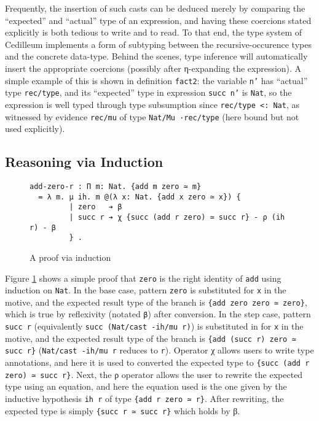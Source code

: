 \documentclass{article}
\begin{document}
Frequently, the insertion of such casts can be deduced merely by comparing the
``expected'' and ``actual'' type of an expression, and having these coercions
stated explicitly is both tedious to write and to read. To that end, the type
system of Cedilleum implements a form of subtyping between the
recursive-occurence types and the concrete data-type. Behind the scenes, type
inference will automatically insert the appropriate coercions (possibly after
η-expanding the expression). A simple example of this is shown in definition
\texttt{fact2}: the variable \texttt{n'} has ``actual'' type \texttt{rec/type}, and its
``expected'' type in expression \texttt{succ n'} is \texttt{Nat}, so the
expression is well typed through type subsumption since \texttt{rec/type <:
  Nat}, as witnessed by evidence \texttt{rec/mu} of type \texttt{Nat/Mu
  ·rec/type} (here bound but not used explicitly).

\subsection{Reasoning via Induction}
\label{sec:induction}
\begin{figure}[h]
\begin{verbatim}
add-zero-r : Π m: Nat. {add m zero ≃ m}
  = λ m. μ ih. m @(λ x: Nat. {add x zero ≃ x}) {
         | zero   ➔ β
         | succ r ➔ χ {succ (add r zero) ≃ succ r} - ρ (ih r) - β
         } .
\end{verbatim}
  \caption{A proof via induction}
  \label{fig:ex-data-ind}
\end{figure}
Figure \ref{fig:ex-data-ind} shows a simple proof that \texttt{zero} is the
right identity of \texttt{add} using induction on \texttt{Nat}. In the base
case, pattern \texttt{zero} is substituted for \texttt{x} in the motive, and the
expected result type of the branch is \texttt{\{add zero zero ≃ zero\}}, which
is true by reflexivity (notated \texttt{β}) after conversion. In the step case,
pattern \texttt{succ r} (equivalently \texttt{succ (Nat/cast -ih/mu r)}) is
substituted in for \texttt{x} in the motive, and the expected result type of the
branch is \texttt{\{add (succ r) zero ≃ succ r\}} (\texttt{Nat/cast -ih/mu r}
reduces to \texttt{r}). Operator χ allows users to write type annotations, and
here it is used to converted the expected type to \texttt{\{succ (add r zero) ≃
succ r\}}. Next, the ρ operator allows the user to rewrite the expected type
using an equation, and here the equation used is the one given by the inductive
hypothesis \texttt{ih r} of type \texttt{\{add r zero ≃ r\}}. After rewriting,
the expected type is simply \texttt{\{succ r ≃ succ r\}} which holds by β.
\end{document}

